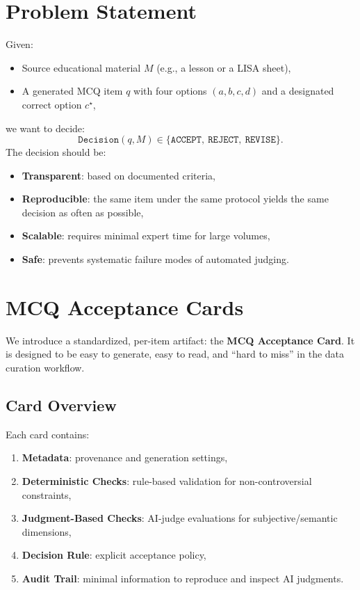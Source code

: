 \documentclass[11pt]{article}
\begin{document}
\section{Problem Statement}
Given:
\begin{itemize}[leftmargin=*]
  \item Source educational material $M$ (e.g., a lesson or a LISA sheet),
  \item A generated MCQ item $q$ with four options $(a,b,c,d)$ and a designated correct option $c^\star$,
\end{itemize}
we want to decide:
\[
\texttt{Decision}(q,M) \in \{\texttt{ACCEPT},\ \texttt{REJECT},\ \texttt{REVISE}\}.
\]
The decision should be:
\begin{itemize}[leftmargin=*]
  \item \textbf{Transparent}: based on documented criteria,
  \item \textbf{Reproducible}: the same item under the same protocol yields the same decision as often as possible,
  \item \textbf{Scalable}: requires minimal expert time for large volumes,
  \item \textbf{Safe}: prevents systematic failure modes of automated judging.
\end{itemize}

\section{MCQ Acceptance Cards}
We introduce a standardized, per-item artifact: the \textbf{MCQ Acceptance Card}. It is designed to be easy to generate, easy to read, and ``hard to miss'' in the data curation workflow.

\subsection{Card Overview}
Each card contains:
\begin{enumerate}[leftmargin=*]
  \item \textbf{Metadata}: provenance and generation settings,
  \item \textbf{Deterministic Checks}: rule-based validation for non-controversial constraints,
  \item \textbf{Judgment-Based Checks}: AI-judge evaluations for subjective/semantic dimensions,
  \item \textbf{Decision Rule}: explicit acceptance policy,
  \item \textbf{Audit Trail}: minimal information to reproduce and inspect AI judgments.
\end{enumerate}
\end{document}
